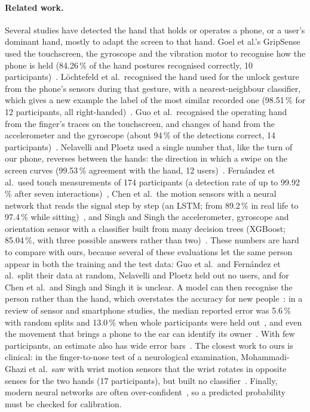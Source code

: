 \paragraph{Related work.} Several studies have detected the hand that holds or operates a phone, or a user's dominant
hand, mostly to adapt the screen to that hand. Goel et al.'s GripSense used the touchscreen, the gyroscope and the
vibration motor to recognise how the phone is held (84.26\,\% of the hand postures recognised
correctly, 10 participants)~\cite{goel2012gripsense}. Löchtefeld et al.\ recognised the hand used for the unlock gesture from the
phone's sensors during that gesture, with a nearest-neighbour classifier, which gives a new example the label of the
most similar recorded one (98.51\,\% for 12 participants, all right-handed)~\cite{lochtefeld2015handedness}. Guo
et al.\ recognised the operating hand from the finger's traces on the touchscreen, and changes of hand from the
accelerometer and the gyroscope (about 94\,\% of the detections correct, 14 participants)~\cite{guo2016operating}.
Nelavelli and Ploetz used a single number that, like the turn of our phone, reverses between the hands: the direction
in which a swipe on the screen curves (99.53\,\% agreement with the hand, 12 users)~\cite{nelavelli2018adaptive}.
Fernández et al.\ used touch measurements of 174 participants (a detection rate of up to 99.92\,\% after seven
interactions)~\cite{fernandez2021implicit}, Chen et al.\ the motion sensors with a neural network that reads the signal step by step (an LSTM;
from 89.2\,\% in real life to 97.4\,\% while sitting)~\cite{chen2023handedness}, and Singh and Singh the
accelerometer, gyroscope and orientation sensor with a classifier built from many decision trees (XGBoost; 85.04\,\%, with three possible
answers rather than two)~\cite{singh2025dominant}. These numbers are hard to compare with ours, because several of
these evaluations let the same person appear in both the training and the test data: Guo et al.\ and Fernández et al.\
split their data at random, Nelavelli and Ploetz held out no users, and for Chen et al.\ and Singh and Singh it is
unclear. A model can then recognise the person rather than the hand, which overstates the accuracy for new
people~\cite{little2017crossvalidation,chaibubneto2019subject}: in a review of sensor and smartphone studies, the median
reported error was 5.6\,\% with random splits and 13.0\,\% when whole participants were held out~\cite{saeb2017usecase}, and
even the movement that brings a phone to the ear can identify its owner~\cite{conti2011mind}. With few participants, an
estimate also has wide error bars~\cite{varoquaux2018cvfailure}. The closest work to ours is clinical: in the
finger-to-nose test of a neurological examination, Mohammadi-Ghazi et al.\ saw with wrist motion sensors that the wrist
rotates in opposite senses for the two hands (17 participants), but built no classifier~\cite{mohammadighazi2022ataxia}.
Finally, modern neural networks are often over-confident~\cite{guo2017calibration}, so a predicted probability must be
checked for calibration.
